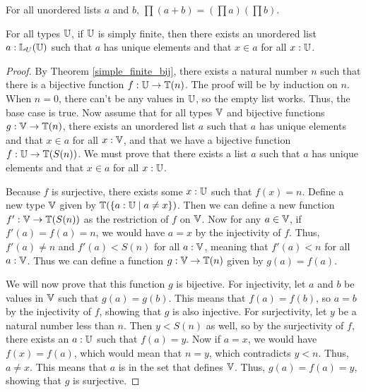 \documentclass[../../math.tex]{subfiles}
\begin{document}
\begin{theorem} \label{ulist_prod_conc}
    For all unordered lists $a$ and $b$, $\prod (a + b) = (\prod a) (\prod b)$.
\end{theorem}

\begin{theorem} \label{ulist_finite}
    For all types $\mathbb{U}$, if $\mathbb{U}$ is simply finite, then there exists an unordered
    list $a : \mathbb{L}_U(\mathbb{U})$ such that $a$ has unique elements and that $x \in a$ for
    all $x : \mathbb{U}$.
\end{theorem}
\begin{proof}
    By Theorem \ref{simple_finite_bij}, there exists a natural number $n$ such
    that there is a bijective function $f : \mathbb{U} \to \mathbb{T}(n)$.  The proof will be by
    induction on $n$.  When $n = 0$, there can't be any values in $\mathbb{U}$, so the
    empty list works.  Thus, the base case is true.  Now assume that for all
    types $\mathbb{V}$ and bijective functions $g : \mathbb{V} \to \mathbb{T}(n)$, there exists an
    unordered list $a$ such that $a$ has unique elements and that $x \in a$ for
    all $x : \mathbb{V}$, and that we have a bijective function $f : \mathbb{U} \to \mathbb{T}(S(n))$.
    We must prove that there exists a list $a$ such that $a$ has unique elements
    and that $x \in a$ for all $x : \mathbb{U}$.

    Because $f$ is surjective, there exists some $x : \mathbb{U}$ such that $f(x) = n$.
    Define a new type $\mathbb{V}$ given by $\mathbb{T}(\{a : \mathbb{U} \mid a \neq x\})$.  Then we can
    define a new function $f' : \mathbb{V} \to \mathbb{T}(S(n))$ as the restriction of $f$ on
    $\mathbb{V}$.  Now for any $a \in \mathbb{V}$, if $f'(a) = f(a) = n$, we would have $a = x$
    by the injectivity of $f$.  Thus, $f'(a) \neq n$ and $f'(a) < S(n)$ for all
    $a : \mathbb{V}$, meaning that $f'(a) < n$ for all $a : \mathbb{V}$.  Thus we can define a
    function $g : \mathbb{V} \to \mathbb{T}(n)$ given by $g(a) = f(a)$.

    We will now prove that this function $g$ is bijective.  For injectivity, let
    $a$ and $b$ be values in $\mathbb{V}$ such that $g(a) = g(b)$.  This means that
    $f(a) = f(b)$, so $a = b$ by the injectivity of $f$, showing that $g$ is
    also injective.  For surjectivity, let $y$ be a natural number less than
    $n$.  Then $y < S(n)$ as well, so by the surjectivity of $f$, there exists
    an $a : \mathbb{U}$ such that $f(a) = y$.  Now if $a = x$, we would have $f(x) =
    f(a)$, which would mean that $n = y$, which contradicts $y < n$.  Thus, $a
    \neq x$.  This means that $a$ is in the set that defines $\mathbb{V}$.  Thus, $g(a)
    = f(a) = y$, showing that $g$ is surjective.


\end{proof}
\end{document}
